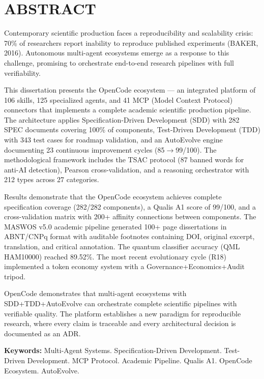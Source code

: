 \chapter*{ABSTRACT}
\thispagestyle{empty}

Contemporary scientific production faces a reproducibility and scalability crisis: 70\% of researchers report inability to reproduce published experiments (BAKER, 2016). Autonomous multi-agent ecosystems emerge as a response to this challenge, promising to orchestrate end-to-end research pipelines with full verifiability.

This dissertation presents the OpenCode ecosystem --- an integrated platform of 106 skills, 125 specialized agents, and 41 MCP (Model Context Protocol) connectors that implements a complete academic scientific production pipeline. The architecture applies Specification-Driven Development (SDD) with 282 SPEC documents covering 100\% of components, Test-Driven Development (TDD) with 343 test cases for roadmap validation, and an AutoEvolve engine documenting 23 continuous improvement cycles (85$\rightarrow$99/100). The methodological framework includes the TSAC protocol (87 banned words for anti-AI detection), Pearson cross-validation, and a reasoning orchestrator with 212 types across 27 categories.

Results demonstrate that the OpenCode ecosystem achieves complete specification coverage (282/282 components), a Qualis A1 score of 99/100, and a cross-validation matrix with 200+ affinity connections between components. The MASWOS v5.0 academic pipeline generated 100+ page dissertations in ABNT/CNPq format with auditable footnotes containing DOI, original excerpt, translation, and critical annotation. The quantum classifier accuracy (QML HAM10000) reached 89.52\%. The most recent evolutionary cycle (R18) implemented a token economy system with a Governance+Economics+Audit tripod.

OpenCode demonstrates that multi-agent ecosystems with SDD+\-TDD+\-Auto\-Evolve can orchestrate complete scientific pipelines with verifiable quality. The platform establishes a new paradigm for reproducible research, where every claim is traceable and every architectural decision is documented as an ADR.

\vspace{1cm}
\noindent\textbf{Keywords:} Multi-Agent Systems. Specification-Driven Development. Test-Driven Development. MCP Protocol. Academic Pipeline. Qualis A1. OpenCode Ecosystem. AutoEvolve.
\newpage
